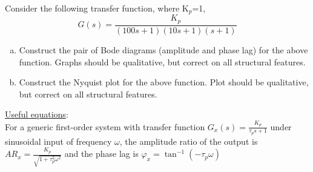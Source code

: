 \documentclass[calculator,datasheet,solutions]{exam}
\newcommand{\frc}{\displaystyle\frac}
\begin{document}
\clearpage

\begin{question}
%
Consider the following transfer function, where K$_{p}$=1,
\begin{displaymath}
G(s) = \frc{K_{p}}{(100s+1)(10s+1)(s+1)}
\end{displaymath}
\begin{enumerate}[(a)]
\item Construct the pair of Bode diagrams (amplitude and phase lag) for the above function. Graphs should be qualitative, but correct on all structural features.~

\item Construct the Nyquist plot for the above function. Plot should be qualitative, but correct on all structural features.~
\end{enumerate} 

\underline{Useful equations}:\\
	For a generic first-order system with transfer function $G_{x}(s)=\frc{K_{p}}{\tau_{p}s+1}$ under sinusoidal input of frequency $\omega$, the amplitude ratio of the output is $AR_{x}=\frc{K_{p}}{\sqrt{1+\tau_{p}^{2}\omega^{2}}}$ and the phase lag is $\varphi_{x}=\tan^{-1}\left(-\tau_{p}\omega\right)$


%
\end{question}

\clearpage
\end{document}
